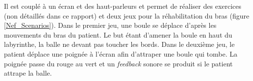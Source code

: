		\begin{minipage}{\linewidth}
			\label{Nef_ARMin}
		\end{minipage}\medskip
		
		Il est couplé à un écran et des haut-parleurs et permet de réaliser des exercices (non détaillés dans ce rapport) et deux jeux pour la réhabilitation du bras (figure \ref{Nef_Scenarios}). Dans le premier jeu, une boule se déplace d'après les mouvements du bras du patient. Le but étant d'amener la boule en haut du labyrinthe, la balle ne devant pas toucher les bords. Dans le deuxième jeu, le patient déplace une poignée à l'écran afin d'attraper une boule qui tombe. La poignée passe du rouge au vert et un \textit{feedback} sonore se produit si le patient attrape la balle.
		
		\begin{minipage}{\linewidth}
			\label{Nef_Scenarios}
		\end{minipage}\medskip
		
